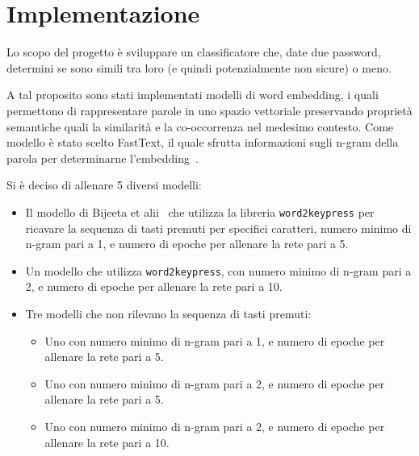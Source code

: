 \chapter{Implementazione}
\label{ch:implementazione}

Lo scopo del progetto è sviluppare un classificatore che, date due password, determini se sono simili tra loro (e quindi potenzialmente non sicure) o meno.

A tal proposito sono stati implementati modelli di word embedding, i quali permettono di rappresentare parole in uno spazio vettoriale preservando proprietà semantiche quali la similarità e la co-occorrenza nel medesimo contesto.
Come modello è stato scelto FastText, il quale sfrutta informazioni sugli n-gram della parola per determinarne l'embedding~\cite{biijeta}.

Si è deciso di allenare 5 diversi modelli:
\begin{itemize}
    \item Il modello di Bijeeta et alii~\cite{biijeta} che utilizza la libreria \texttt{word2keypress} per ricavare la sequenza di tasti premuti per specifici caratteri, numero minimo di n-gram pari a 1, e numero di epoche per allenare la rete pari a 5.
    \item Un modello che utilizza \texttt{word2keypress}, con numero minimo di n-gram pari a 2, e numero di epoche per allenare la rete pari a 10.
    \item Tre modelli che non rilevano la sequenza di tasti premuti:
    \begin{itemize}
        \item Uno con numero minimo di n-gram pari a 1, e numero di epoche per allenare la rete pari a 5.
        \item Uno con numero minimo di n-gram pari a 2, e numero di epoche per allenare la rete pari a 5.
        \item Uno con numero minimo di n-gram pari a 2, e numero di epoche per allenare la rete pari a 10.
    \end{itemize}
\end{itemize}

